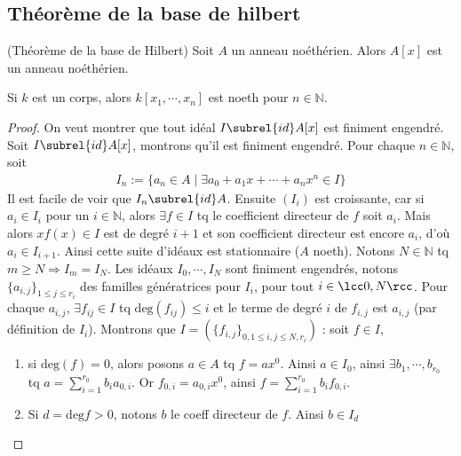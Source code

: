         \subsection{Théorème de la base de hilbert}
            \begin{theo} (Théorème de la base de Hilbert)
                \label{base_de_hilbert}
                Soit $A$ un anneau noéthérien. Alors $A[x]$ est un anneau noéthérien.
            \end{theo}
            \begin{coro}
                Si $k$ est un corps, alors $k[x_1, \cdots, x_n]$ est noeth pour $n \in \mathbb{N}$.
            \end{coro}
            \begin{proof}
                On veut montrer que tout idéal $I \subrel{id} A[x]$ est finiment engendré. Soit $I \subrel{id} A[x]$, montrons qu'il est finiment engendré. Pour chaque $n \in \mathbb{N}$, soit
                \begin{align*}
                    I_n := \{a_n \in A \mid \exists a_0 + a_1x + \cdots + a_n x^n \in I\}
                \end{align*}
                Il est facile de voir que $I_n \subrel{id} A$. Ensuite $(I_i)$ est croissante, car si $a_i \in I_i$ pour un $i \in \mathbb{N}$, alors $\exists f \in I$ tq le coefficient directeur de $f$ soit $a_i$. Mais alors $xf(x) \in I$ est de degré $i+1$ et son coefficient directeur est encore $a_i$, d'où $a_i \in I_{i+1}$. Ainsi cette suite d'idéaux est stationnaire ($A$ noeth). Notons $N \in \mathbb{N}$ tq $m \geq N \Rightarrow I_m = I_N$. Les idéaux $I_0, \cdots, I_N$ sont finiment engendrés, notons $\{a_{i,j}\}_{1 \leq j \leq r_i}$ des familles génératrices pour $I_i$, pour tout $i \in \lcc 0, N \rcc$. Pour chaque $a_{i,j}$, $\exists f_{ij} \in I$ tq $\mathrm{deg}(f_{ij}) \leq i$ et le terme de degré $i$ de $f_{i,j}$ est $a_{i,j}$ (par définition de $I_i$). Montrons que $I = (\{f_{i,j}\}_{0,1 \leq i,j \leq N,r_i})$ : soit $f \in I$,
                \begin{enumerate}
                    \item si $\mathrm{deg}(f) = 0$, alors posons $a \in A$ tq $f = ax^0$. Ainsi $a \in I_0$, ainsi $\exists b_1, \cdots, b_{r_0}$ tq $a = \sum_{i = 1}^{r_0} b_i a_{0,i}$. Or $f_{0,i} = a_{0,i}x^0$, ainsi $f = \sum_{i = 1}^{r_0} b_i f_{0,i}$.
                    \item Si $d = \mathrm{deg} f > 0$, notons $b$ le coeff directeur de $f$. Ainsi $b \in I_d$ \\

\end{enumerate}
\end{proof}
